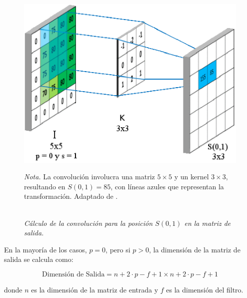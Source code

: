                     \begin{figure}[H] 
                        \caption{\doublespacing \\ \textit{ Cálculo de la convolución para la posición \( S(0, 1) \) en la matriz de salida.}} 
                        \centering
                        \includegraphics[width=1\linewidth]{2_CAPITULO0/IMG/padding2.png}
                        \begin{justify}
                            \textit{Nota.} La convolución involucra una matriz \(5 \times 5\) y un kernel \(3 \times 3\), resultando en \(S(0,1) = 85\), con líneas azules que representan la transformación. Adaptado de \textcite{Goodfellow2016}.
                        \end{justify}                    
                        \label{padding2}
                    \end{figure}
                    

                    En la mayoría de los casos, \( p = 0 \), pero si \( p > 0 \), la dimensión de la matriz de salida se calcula como:
                    
                    \begin{equation}
                        \text{Dimensión de Salida} = n + 2 \cdot p - f + 1 \times n + 2 \cdot p - f + 1
                    \end{equation}
                    
                    donde \( n \) es la dimensión de la matriz de entrada y \( f \) es la dimensión del filtro.
                    
